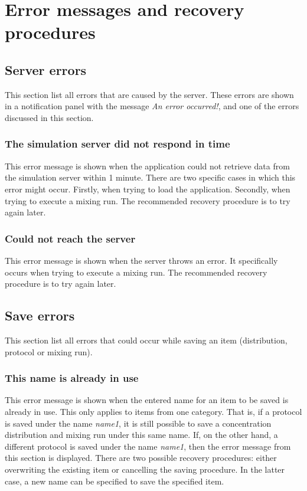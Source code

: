 \chapter{Error messages and recovery procedures}

\section {Server errors}
This section list all errors that are caused by the server. These errors are shown in a notification panel with the message \emph{An error occurred!}, and one of the errors discussed in this section.

\subsection{The simulation server did not respond in time}
This error message is shown when the application could not retrieve data from the simulation server within 1 minute. There are two specific cases in which this error might occur. Firstly, when trying to load the application. Secondly, when trying to execute a mixing run. The recommended recovery procedure is to try again later.

\subsection{Could not reach the server}
This error message is shown when the server throws an error. It specifically occurs when trying to execute a mixing run. The recommended recovery procedure is to try again later.

\section{Save errors}
This section list all errors that could occur while saving an item (distribution, protocol or mixing run).

\subsection{This name is already in use}
This error message is shown when the entered name for an item to be saved is already in use. This only applies to items from one category. That is, if a protocol is saved under the name \emph{name1}, it is still possible to save a concentration distribution and mixing run under this same name. If, on the other hand, a different protocol is saved under the name \emph{name1}, then the error message from this section is displayed. There are two possible recovery procedures: either overwriting the existing item or cancelling the saving procedure. In the latter case, a new name can be specified to save the specified item.

